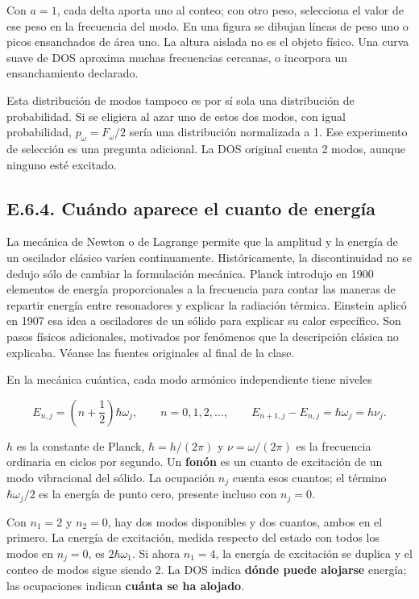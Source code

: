 \documentclass[
  spanish,
  10pt,
  a4paper,
]{article}
\begin{document}
Con \(a=1\), cada delta aporta uno al conteo; con otro peso, selecciona
el valor de ese peso en la frecuencia del modo. En una figura se dibujan
líneas de peso uno o picos ensanchados de área uno. La altura aislada no
es el objeto físico. Una curva suave de DOS aproxima muchas frecuencias
cercanas, o incorpora un ensanchamiento declarado.

Esta distribución de modos tampoco es por sí sola una distribución de
probabilidad. Si se eligiera al azar uno de estos dos modos, con igual
probabilidad, \(p_\omega=F_\omega/2\) sería una distribución normalizada
a 1. Ese experimento de selección es una pregunta adicional. La DOS
original cuenta 2 modos, aunque ninguno esté excitado.

\subsection{E.6.4. Cuándo aparece el cuanto de
energía}\label{e.6.4.-cuuxe1ndo-aparece-el-cuanto-de-energuxeda}

La mecánica de Newton o de Lagrange permite que la amplitud y la energía
de un oscilador clásico varíen continuamente. Históricamente, la
discontinuidad no se dedujo sólo de cambiar la formulación mecánica.
Planck introdujo en 1900 elementos de energía proporcionales a la
frecuencia para contar las maneras de repartir energía entre resonadores
y explicar la radiación térmica. Einstein aplicó en 1907 esa idea a
osciladores de un sólido para explicar su calor específico. Son pasos
físicos adicionales, motivados por fenómenos que la descripción clásica
no explicaba. Véanse las fuentes originales al final de la clase.

En la mecánica cuántica, cada modo armónico independiente tiene niveles

\[
E_{n,j}=\left(n+\frac12\right)\hbar\omega_j,
\qquad n=0,1,2,\ldots,
\qquad E_{n+1,j}-E_{n,j}=\hbar\omega_j=h\nu_j.
\tag{E05.b}
\]

\(h\) es la constante de Planck, \(\hbar=h/(2\pi)\) y
\(\nu=\omega/(2\pi)\) es la frecuencia ordinaria en ciclos por segundo.
Un \textbf{fonón} es un cuanto de excitación de un modo vibracional del
sólido. La ocupación \(n_j\) cuenta esos cuantos; el término
\(\hbar\omega_j/2\) es la energía de punto cero, presente incluso con
\(n_j=0\).

Con \(n_1=2\) y \(n_2=0\), hay dos modos disponibles y dos cuantos,
ambos en el primero. La energía de excitación, medida respecto del
estado con todos los modos en \(n_j=0\), es \(2\hbar\omega_1\). Si ahora
\(n_1=4\), la energía de excitación se duplica y el conteo de modos
sigue siendo 2. La DOS indica \textbf{dónde puede alojarse} energía; las
ocupaciones indican \textbf{cuánta se ha alojado}.
\end{document}
